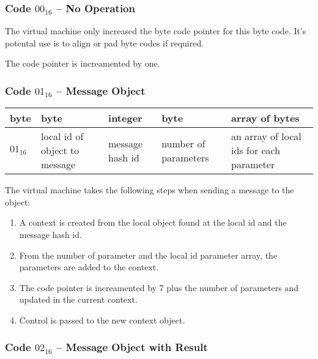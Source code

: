 \subsubsection{Code $00_{16}$ -- No Operation}
The virtual machine only increased the byte code pointer for this byte code.
It's potental use is to align or pad byte codes if required.

The code pointer is increamented by one.

\subsubsection{Code $01_{16}$ -- Message Object}

\begin{center}
  \begin{tabular}{|l|p{3cm}|p{3cm}|p{3cm}|p{3cm}|}
    \hline
    \textbf{byte} & \textbf{byte} & \textbf{integer} & \textbf{byte} &
    \textbf{array of bytes} \\
    \hline
    $01_{16}$ & local id of object to message & message hash id &
    number of parameters & an array of local ids for each parameter \\
    \hline
  \end{tabular}
\end{center}
The virtual machine takes the following steps when sending a message to the
object:
\begin{enumerate}
\item A context is created from the local object found at the local id and the
  message hash id.
\item From the number of parameter and the local id parameter array, the
  parameters are added to the context.
\item The code pointer is increamented by 7 plus the number of parameters and
  updated in the current context.
\item Control is passed to the new context object.
\end{enumerate}

\subsubsection{Code $02_{16}$ -- Message Object with Result}

